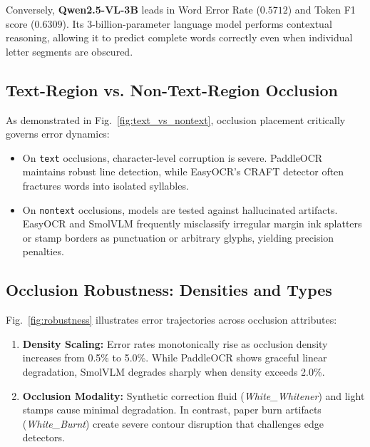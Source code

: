 \documentclass[conference,10pt,a4paper]{IEEEtran}
\begin{document}
Conversely, \textbf{Qwen2.5-VL-3B} leads in Word Error Rate ($0.5712$) and Token F1 score ($0.6309$). Its 3-billion-parameter language model performs contextual reasoning, allowing it to predict complete words correctly even when individual letter segments are obscured.

\subsection{Text-Region vs. Non-Text-Region Occlusion}
As demonstrated in Fig.~\ref{fig:text_vs_nontext}, occlusion placement critically governs error dynamics:
\begin{itemize}
    \item On \texttt{text} occlusions, character-level corruption is severe. PaddleOCR maintains robust line detection, while EasyOCR's CRAFT detector often fractures words into isolated syllables.
    \item On \texttt{nontext} occlusions, models are tested against hallucinated artifacts. EasyOCR and SmolVLM frequently misclassify irregular margin ink splatters or stamp borders as punctuation or arbitrary glyphs, yielding precision penalties.
\end{itemize}

\subsection{Occlusion Robustness: Densities and Types}
Fig.~\ref{fig:robustness} illustrates error trajectories across occlusion attributes:
\begin{enumerate}
    \item \textbf{Density Scaling:} Error rates monotonically rise as occlusion density increases from 0.5\% to 5.0\%. While PaddleOCR shows graceful linear degradation, SmolVLM degrades sharply when density exceeds 2.0\%.
    \item \textbf{Occlusion Modality:} Synthetic correction fluid (\textit{White\_Whitener}) and light stamps cause minimal degradation. In contrast, paper burn artifacts (\textit{White\_Burnt}) create severe contour disruption that challenges edge detectors.
\end{enumerate}
\end{document}
